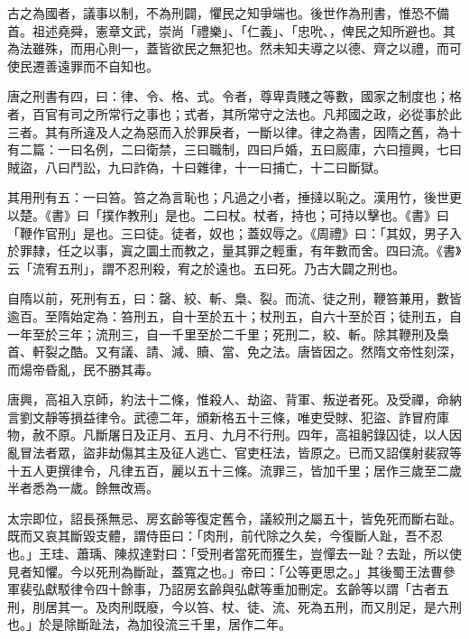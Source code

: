 
\begin{pinyinscope}

 古之為國者，議事以制，不為刑闢，懼民之知爭端也。後世作為刑書，惟恐不備首。祖述堯舜，憲章文武，崇尚「禮樂」、「仁義」、「忠吮、，俾民之知所避也。其為法雖殊，而用心則一，蓋皆欲民之無犯也。然未知夫導之以德、齊之以禮，而可使民遷善遠罪而不自知也。



 唐之刑書有四，曰：律、令、格、式。令者，尊卑貴賤之等數，國家之制度也；格者，百官有司之所常行之事也；式者，其所常守之法也。凡邦國之政，必從事於此三者。其有所違及人之為惡而入於罪戾者，一斷以律。律之為書，因隋之舊，為十有二篇：一曰名例，二曰衛禁，三曰職制，四曰戶婚，五曰廄庫，六曰擅興，七曰賊盜，八曰鬥訟，九曰詐偽，十曰雜律，十一曰捕亡，十二曰斷獄。



 其用刑有五：一曰笞。笞之為言恥也；凡過之小者，捶撻以恥之。漢用竹，後世更以楚。《書》曰「撲作教刑」是也。二曰杖。杖者，持也；可持以擊也。《書》曰「鞭作官刑」是也。三曰徒。徒者，奴也；蓋奴辱之。《周禮》曰：「其奴，男子入於罪隸，任之以事，寘之圜土而教之，量其罪之輕重，有年數而舍。四曰流。《書》云「流宥五刑」，謂不忍刑殺，宥之於遠也。五曰死。乃古大闢之刑也。



 自隋以前，死刑有五，曰：罄、絞、斬、梟、裂。而流、徒之刑，鞭笞兼用，數皆逾百。至隋始定為：笞刑五，自十至於五十；杖刑五，自六十至於百；徒刑五，自一年至於三年；流刑三，自一千里至於二千里；死刑二，絞、斬。除其鞭刑及梟首、軒裂之酷。又有議、請、減、贖、當、免之法。唐皆因之。然隋文帝性刻深，而煬帝昏亂，民不勝其毒。



 唐興，高祖入京師，約法十二條，惟殺人、劫盜、背軍、叛逆者死。及受禪，命納言劉文靜等損益律令。武德二年，頒新格五十三條，唯吏受賕、犯盜、詐冒府庫物，赦不原。凡斷屠日及正月、五月、九月不行刑。四年，高祖躬錄囚徒，以人因亂冒法者眾，盜非劫傷其主及征人逃亡、官吏枉法，皆原之。已而又詔僕射裴寂等十五人更撰律令，凡律五百，麗以五十三條。流罪三，皆加千里；居作三歲至二歲半者悉為一歲。餘無改焉。



 太宗即位，詔長孫無忌、房玄齡等復定舊令，議絞刑之屬五十，皆免死而斷右趾。既而又哀其斷毀支體，謂侍臣曰：「肉刑，前代除之久矣，今復斷人趾，吾不忍也。」王珪、蕭瑀、陳叔達對曰：「受刑者當死而獲生，豈憚去一趾？去趾，所以使見者知懼。今以死刑為斷趾，蓋寬之也。」帝曰：「公等更思之。」其後蜀王法曹參軍裴弘獻駁律令四十餘事，乃詔房玄齡與弘獻等重加刪定。玄齡等以謂「古者五刑，刖居其一。及肉刑既廢，今以笞、杖、徒、流、死為五刑，而又刖足，是六刑也。」於是除斷趾法，為加役流三千里，居作二年。




\end{pinyinscope}
